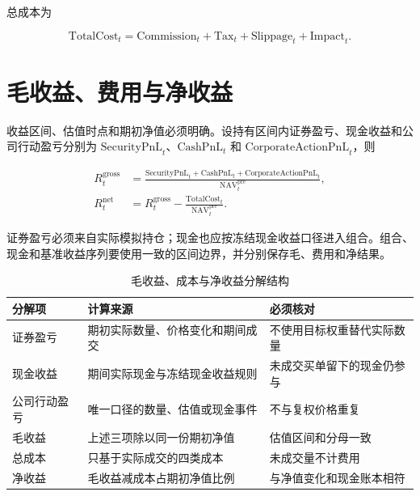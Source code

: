 总成本为

\begin{equation}
  \mathrm{TotalCost}_t
  =\mathrm{Commission}_t+\mathrm{Tax}_t
  +\mathrm{Slippage}_t+\mathrm{Impact}_t.
  \label{eq:ch10-total-cost}
\end{equation}

\section{毛收益、费用与净收益}

收益区间、估值时点和期初净值必须明确。设持有区间内证券盈亏、现金收益和公司行动盈亏分别为 \(\mathrm{SecurityPnL}_t\)、\(\mathrm{CashPnL}_t\) 和 \(\mathrm{CorporateActionPnL}_t\)，则

\begin{align}
  R^{\mathrm{gross}}_t
  &=\frac{\mathrm{SecurityPnL}_t+\mathrm{CashPnL}_t
  +\mathrm{CorporateActionPnL}_t}
  {\mathrm{NAV}^{\mathrm{pre}}_t},
  \label{eq:ch10-gross-return}\\
  R^{\mathrm{net}}_t
  &=R^{\mathrm{gross}}_t
  -\frac{\mathrm{TotalCost}_t}{\mathrm{NAV}^{\mathrm{pre}}_t}.
  \label{eq:ch10-net-return}
\end{align}

证券盈亏必须来自实际模拟持仓；现金也应按冻结现金收益口径进入组合。组合、现金和基准收益序列要使用一致的区间边界，并分别保存毛、费用和净结果。

\begin{table}[htbp]
  \centering
  \small
  \caption{毛收益、成本与净收益分解结构}
  \label{tab:ch10-return-decomposition}
  \begin{tabularx}{\textwidth}{p{3.1cm} p{5.0cm} Y}
    \toprule
    分解项 & 计算来源 & 必须核对 \\
    \midrule
    证券盈亏 & 期初实际数量、价格变化和期间成交 & 不使用目标权重替代实际数量 \\
    现金收益 & 期间实际现金与冻结现金收益规则 & 未成交买单留下的现金仍参与 \\
    公司行动盈亏 & 唯一口径的数量、估值或现金事件 & 不与复权价格重复 \\
    毛收益 & 上述三项除以同一份期初净值 & 估值区间和分母一致 \\
    总成本 & 只基于实际成交的四类成本 & 未成交量不计费用 \\
    净收益 & 毛收益减成本占期初净值比例 & 与净值变化和现金账本相符 \\
    \bottomrule
  \end{tabularx}
\end{table}

